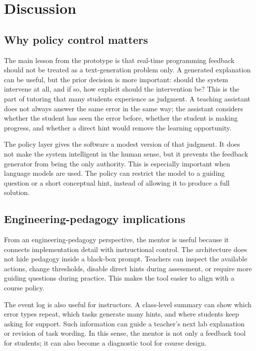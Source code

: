 \documentclass[11pt]{article}
\begin{document}
\section{Discussion}

\subsection{Why policy control matters}

The main lesson from the prototype is that real-time programming feedback should not be treated as a text-generation problem only. A generated explanation can be useful, but the prior decision is more important: should the system intervene at all, and if so, how explicit should the intervention be? This is the part of tutoring that many students experience as judgment. A teaching assistant does not always answer the same error in the same way; the assistant considers whether the student has seen the error before, whether the student is making progress, and whether a direct hint would remove the learning opportunity.

The policy layer gives the software a modest version of that judgment. It does not make the system intelligent in the human sense, but it prevents the feedback generator from being the only authority. This is especially important when language models are used. The policy can restrict the model to a guiding question or a short conceptual hint, instead of allowing it to produce a full solution.

\subsection{Engineering-pedagogy implications}

From an engineering-pedagogy perspective, the mentor is useful because it connects implementation detail with instructional control. The architecture does not hide pedagogy inside a black-box prompt. Teachers can inspect the available actions, change thresholds, disable direct hints during assessment, or require more guiding questions during practice. This makes the tool easier to align with a course policy.

The event log is also useful for instructors. A class-level summary can show which error types repeat, which tasks generate many hints, and where students keep asking for support. Such information can guide a teacher's next lab explanation or revision of task wording. In this sense, the mentor is not only a feedback tool for students; it can also become a diagnostic tool for course design.
\end{document}
